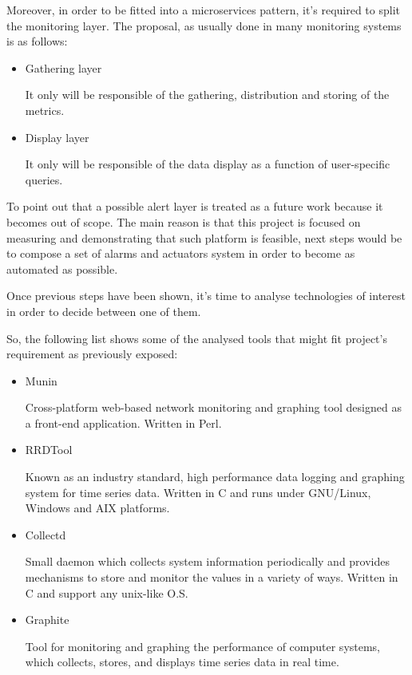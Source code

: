 Moreover, in order to be fitted into a microservices pattern, it's required to split the monitoring layer. The proposal, as usually done in many monitoring systems is as follows:
\begin{itemize}
\item Gathering layer \hfill

It only will be responsible of the gathering, distribution and storing of the metrics.

\item Display layer

It only will be responsible of the data display as a function of user-specific queries.

\end{itemize}
To point out that a possible alert layer is treated as a future work because it becomes out of scope. The main reason is that this project is focused on measuring and demonstrating that such platform is feasible, next steps would be to compose a set of alarms and actuators system in order to become as automated as possible.

Once previous steps have been shown, it's time to analyse technologies of interest in order to decide between one of them.

So, the following list shows some of the analysed tools that might fit project's requirement as previously exposed:

\begin{itemize}
\item Munin \hfill

Cross-platform web-based network monitoring and graphing tool designed as a front-end application. Written in Perl.

\item RRDTool \hfill

Known as an industry standard, high performance data logging and graphing system for time series data. Written in C and runs under GNU/Linux, Windows and AIX platforms.

\item Collectd \hfill

Small daemon which collects system information periodically and provides mechanisms to store and monitor the values in a variety of ways. Written in C and support any unix-like O.S.

\item Graphite \hfill

Tool for monitoring and graphing the performance of computer systems, which collects, stores, and displays time series data in real time.

\end{itemize}

